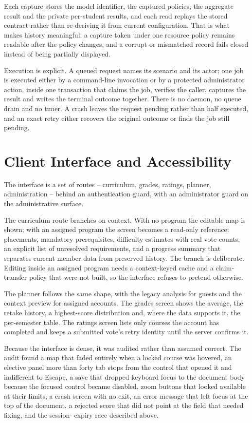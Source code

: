 Each capture stores the model identifier, the captured policies, the aggregate result and the
private per-student results, and each read replays the stored contract rather than re-deriving it
from current configuration. That is what makes history meaningful: a capture taken under one
resource policy remains readable after the policy changes, and a corrupt or mismatched record fails
closed instead of being partially displayed.

Execution is explicit. A queued request names its scenario and its actor; one job is executed either
by a command-line invocation or by a protected administrator action, inside one transaction that
claims the job, verifies the caller, captures the result and writes the terminal outcome together.
There is no daemon, no queue drain and no timer. A crash leaves the request pending rather than half
executed, and an exact retry either recovers the original outcome or finds the job still pending.

\section{Client Interface and Accessibility}

The interface is a set of routes -- curriculum, grades, ratings, planner, administration -- behind
an authentication guard, with an administrator guard on the administrative surface.

The curriculum route branches on context. With no program the editable map is shown; with an
assigned program the screen becomes a read-only reference: placements, mandatory prerequisites,
difficulty estimates with real vote counts, an explicit list of unresolved requirements, and a
progress summary that separates current member data from preserved history. The branch is
deliberate. Editing inside an assigned program needs a context-keyed cache and a claim-transfer
policy that were not built, so the interface refuses to pretend otherwise.

The planner follows the same shape, with the legacy analysis for guests and the context preview for
assigned accounts. The grades screen shows the average, the retake history, a highest-score
distribution and, where the data supports it, the per-semester table. The ratings screen lists only
courses the account has completed and keeps a submitted vote's retry identity until the server
confirms it.

Because the interface is dense, it was audited rather than assumed correct. The audit found a map
that faded entirely when a locked course was hovered, an elective panel more than forty tab stops
from the control that opened it and indifferent to Escape, a save that dropped keyboard focus to the
document body because the focused control became disabled, zoom buttons that looked available at
their limits, a crash screen with no exit, an error message that left focus at the top of the
document, a rejected score that did not point at the field that needed fixing, and the session-
expiry race described above.

